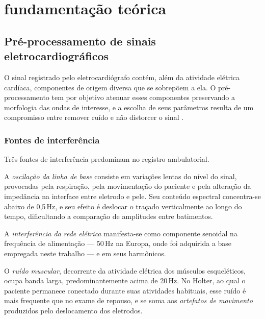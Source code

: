 \chapter{fundamentação teórica}
\label{cap:fundamentacao-teorica}



%

\section{Pré-processamento de sinais eletrocardiográficos}
\label{sec:fund-preprocessamento}

O sinal registrado pelo eletrocardiógrafo contém, além da atividade
elétrica cardíaca, componentes de origem diversa que se sobrepõem a ela. O
pré-processamento tem por objetivo atenuar esses componentes preservando a
morfologia das ondas de interesse, e a escolha de seus parâmetros resulta de
um compromisso entre remover ruído e não distorcer o sinal
\cite{clifford2006advanced}.

\subsection{Fontes de interferência}
\label{subsec:fund-ruidos}

Três fontes de interferência predominam no registro ambulatorial.

A \textit{oscilação da linha de base} consiste em variações lentas do nível
do sinal, provocadas pela respiração, pela movimentação do paciente e pela
alteração da impedância na interface entre eletrodo e pele. Seu conteúdo
espectral concentra-se abaixo de 0,5\,Hz, e seu efeito é deslocar o traçado
verticalmente ao longo do tempo, dificultando a comparação de amplitudes
entre batimentos.

A \textit{interferência da rede elétrica} manifesta-se como componente
senoidal na frequência de alimentação --- 50\,Hz na Europa, onde foi
adquirida a base empregada neste trabalho --- e em seus harmônicos.

O \textit{ruído muscular}, decorrente da atividade elétrica dos músculos
esqueléticos, ocupa banda larga, predominantemente acima de 20\,Hz. No
Holter, ao qual o paciente permanece conectado durante suas atividades
habituais, esse ruído é mais frequente que no exame de repouso, e se soma aos
\textit{artefatos de movimento} produzidos pelo deslocamento dos eletrodos.

